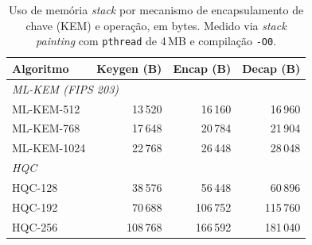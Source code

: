 %
%
%


\begin{table}[ht]
\centering
\caption{Uso de memória \textit{stack} por mecanismo de encapsulamento de
chave (KEM) e operação, em bytes. Medido via \textit{stack painting}
com \texttt{pthread} de 4\,MB e compilação \texttt{-O0}.}
\label{tab:stack_kem}
\begin{tabular}{lrrr}
\toprule
\textbf{Algoritmo} & \textbf{Keygen (B)} & \textbf{Encap (B)} & \textbf{Decap (B)} \\
\midrule
\multicolumn{4}{l}{\textit{ML-KEM (FIPS 203)}} \\[2pt]
\quad ML-KEM-512  &  13\,520 &  16\,160 &  16\,960 \\
\quad ML-KEM-768  &  17\,648 &  20\,784 &  21\,904 \\
\quad ML-KEM-1024 &  22\,768 &  26\,448 &  28\,048 \\
\midrule
\multicolumn{4}{l}{\textit{HQC}} \\[2pt]
\quad HQC-128 &  38\,576 &  56\,448 &  60\,896 \\
\quad HQC-192 &  70\,688 & 106\,752 & 115\,760 \\
\quad HQC-256 & 108\,768 & 166\,592 & 181\,040 \\
\bottomrule
\end{tabular}
\end{table}



